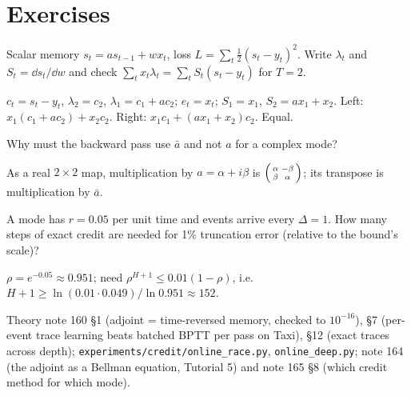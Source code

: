 \documentclass[11pt]{article}
\begin{document}
\section*{Exercises}
\begin{exercise} Scalar memory $s_t=a s_{t-1}+w x_t$, loss $L=\sum_t \tfrac12(s_t-y_t)^2$. Write $\lambda_t$ and $S_t=\dd s_t/\dd w$ and check $\sum_t x_t\lambda_t=\sum_t S_t(s_t-y_t)$ for $T=2$.\end{exercise}
\begin{solution} $c_t=s_t-y_t$, $\lambda_2=c_2$, $\lambda_1=c_1+a c_2$; $e_t=x_t$; $S_1=x_1$, $S_2=ax_1+x_2$. Left: $x_1(c_1+ac_2)+x_2c_2$. Right: $x_1c_1+(ax_1+x_2)c_2$. Equal.\end{solution}
\begin{exercise} Why must the backward pass use $\bar a$ and not $a$ for a complex mode?\end{exercise}
\begin{solution} As a real $2\times2$ map, multiplication by $a=\alpha+i\beta$ is $\begin{psmallmatrix}\alpha&-\beta\\ \beta&\alpha\end{psmallmatrix}$; its transpose is multiplication by $\bar a$.\end{solution}
\begin{exercise} A mode has $r=0.05$ per unit time and events arrive every $\Delta=1$. How many steps of exact credit are needed for 1\% truncation error (relative to the bound's scale)?\end{exercise}
\begin{solution} $\rho=e^{-0.05}\approx0.951$; need $\rho^{H+1}\le0.01(1-\rho)$, i.e. $H+1\ge\ln(0.01\cdot0.049)/\ln0.951\approx152$.\end{solution}

\begin{inourmodels}
Theory note 160 \S1 (adjoint = time-reversed memory, checked to $10^{-16}$), \S7 (per-event trace learning beats batched BPTT per
pass on Taxi), \S12 (exact traces across depth); \texttt{experiments/credit/online\_race.py}, \texttt{online\_deep.py}; note 164
(the adjoint as a Bellman equation, Tutorial 5) and note 165 \S8 (which credit method for which mode).
\end{inourmodels}
\end{document}
